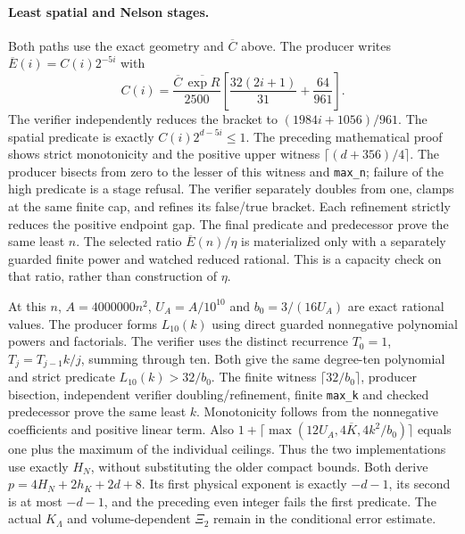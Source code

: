 \documentclass[11pt]{article}
\theoremstyle{plain}
\theoremstyle{definition}
\theoremstyle{remark}
\begin{document}
\paragraph{Least spatial and Nelson stages.}
Both paths use the exact geometry and $\overline C$ above. The producer writes
$\overline E(i)=C(i)2^{-5i}$ with
\[
 C(i)=\frac{\overline C\,\overline{\exp R}}{2500}
 \left[\frac{32(2i+1)}{31}+\frac{64}{961}\right].
\]
The verifier independently reduces the bracket to $(1984i+1056)/961$.
The spatial predicate is exactly $C(i)2^{d-5i}\le1$. The preceding
mathematical proof shows strict monotonicity and the positive upper witness
$\lceil(d+356)/4\rceil$. The producer bisects from zero to the lesser of
this witness and \texttt{max\_n}; failure of the high predicate is a stage
refusal. The verifier separately doubles from one, clamps at the same finite
cap, and refines its false/true bracket. Each refinement strictly reduces
the positive endpoint gap. The final predicate and predecessor prove the
same least $n$. The selected ratio $\overline E(n)/\eta$ is materialized
only with a separately guarded finite power and watched reduced rational.
This is a capacity check on that ratio, rather than construction of $\eta$.

At this $n$, $A=4000000n^2$, $U_A=A/10^{10}$ and $b_0=3/(16U_A)$ are
exact rational values. The producer forms $L_{10}(k)$ using direct guarded
nonnegative polynomial powers and factorials. The verifier uses the distinct
recurrence $T_0=1$, $T_j=T_{j-1}k/j$, summing through ten. Both give the
same degree-ten polynomial and strict predicate $L_{10}(k)>32/b_0$.
The finite witness $\lceil32/b_0\rceil$, producer bisection, independent
verifier doubling/refinement, finite \texttt{max\_k} and checked predecessor
prove the same least $k$. Monotonicity follows from the nonnegative
coefficients and positive linear term. Also
$1+\lceil\max(12U_A,4\overline K,4k^2/b_0)\rceil$ equals one plus the
maximum of the individual ceilings. Thus the two implementations use exactly
$H_N$, without substituting the older compact bounds. Both derive
$p=4H_N+2h_K+2d+8$. Its first physical exponent is exactly $-d-1$, its
second is at most $-d-1$, and the preceding even integer fails the first
predicate. The actual $K_\Lambda$ and volume-dependent $\Xi_2$ remain in
the conditional error estimate.

\end{document}
